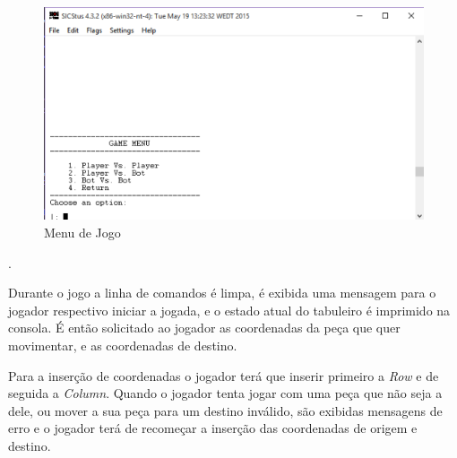 \documentclass[a4paper]{article}
\begin{document}
\begin{figure}[h!]
\begin{center}
\hspace*{-0.5cm}\includegraphics[scale=1]{menu2.png}
\caption{Menu de Jogo}
\end{center}
\end{figure}
.\linebreak
\par Durante o jogo a linha de comandos é limpa, é exibida uma mensagem para o jogador respectivo iniciar a jogada, e o estado atual do tabuleiro é imprimido na consola. É então solicitado ao jogador as coordenadas da peça que quer movimentar, e as coordenadas de destino. 
\par Para a inserção de coordenadas o jogador terá que inserir primeiro a \textit{Row} e de seguida a \textit{Column}. Quando o jogador tenta jogar com uma peça que não seja a dele, ou mover a sua peça para um destino inválido, são exibidas mensagens de erro e o jogador terá de recomeçar a inserção das coordenadas de origem e destino. 
\end{document}
